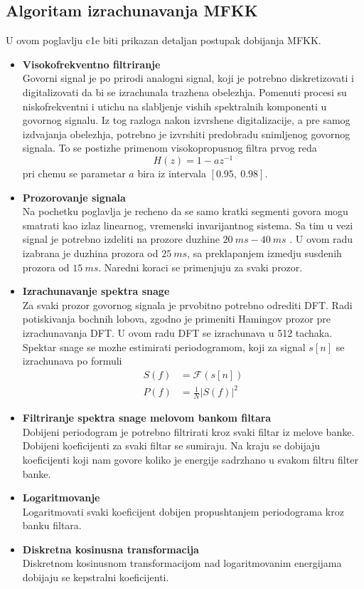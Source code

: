 \documentclass[a4paper, openany, oneside, 11pt]{book}
\begin{document}
\subsection{Algoritam izrachunavanja MFKK}
U ovom poglavlju c1e biti prikazan detaljan postupak dobijanja MFKK.
\begin{itemize}
\item \textbf{Visokofrekventno filtriranje}\\
Govorni signal je po prirodi analogni signal, koji je potrebno diskretizovati i digitalizovati da bi se izrachunala trazhena obelezhja. Pomenuti procesi su niskofrekventni i utichu na slabljenje vishih spektralnih komponenti u govornog signalu. Iz tog razloga nakon izvrshene digitalizacije, a pre samog izdvajanja obelezhja, potrebno je izvrshiti predobradu snimljenog govornog signala. To se postizhe primenom visokopropusnog filtra prvog reda
\begin{equation}
H(z) = 1-az^{-1}
\end{equation}
pri chemu se parametar $a$ bira iz intervala $[0.95,\ 0.98] $\cite{kepstrum}.
\item \textbf{Prozorovanje signala}\\
Na pochetku poglavlja je recheno da se samo kratki segmenti govora mogu smatrati kao izlaz linearnog, vremenski invarijantnog sistema. Sa tim u vezi signal je potrebno izdeliti na prozore duzhine $\SI{20}{ms}-\SI{40}{ms}$  \cite{OPGpredavanja}. U ovom radu izabrana je duzhina prozora od $\SI{25}{ms}$, sa preklapanjem izmedju susdenih prozora od $\SI{15}{ms}$. Naredni koraci se primenjuju za svaki prozor.
\item \textbf{Izrachunavanje spektra snage}\\
Za svaki prozor govornog signala je prvobitno potrebno odrediti DFT. Radi potiskivanja bochnih lobova, zgodno je primeniti Hamingov prozor pre izrachunavanja DFT. U ovom radu DFT se izrachunava u 512 tachaka. Spektar snage se mozhe estimirati periodogramom, koji za signal $s[n]$ se izrachunava po formuli
\begin{align}
S(f) &=\boldsymbol{\mathcal{F}}(s[n])\\
P(f) &=\frac{1}{N}|S(f)|^2
\end{align}
\item \textbf{Filtriranje spektra snage melovom bankom filtara}\\
Dobijeni periodogram je potrebno filtrirati kroz svaki filtar iz melove banke. Dobijeni koeficijenti za svaki filtar se sumiraju. Na kraju se dobijaju koeficijenti koji nam govore koliko je energije sadrzhano u svakom filtru filter banke.
\item \textbf{Logaritmovanje}\\
Logaritmovati svaki koeficijent dobijen propushtanjem periodograma kroz banku filtara.
\item \textbf{Diskretna kosinusna transformacija}\\
Diskretnom kosinusnom transformacijom nad logaritmovanim energijama dobijaju se kepstralni koeficijenti.
\end{itemize}
\end{document}
